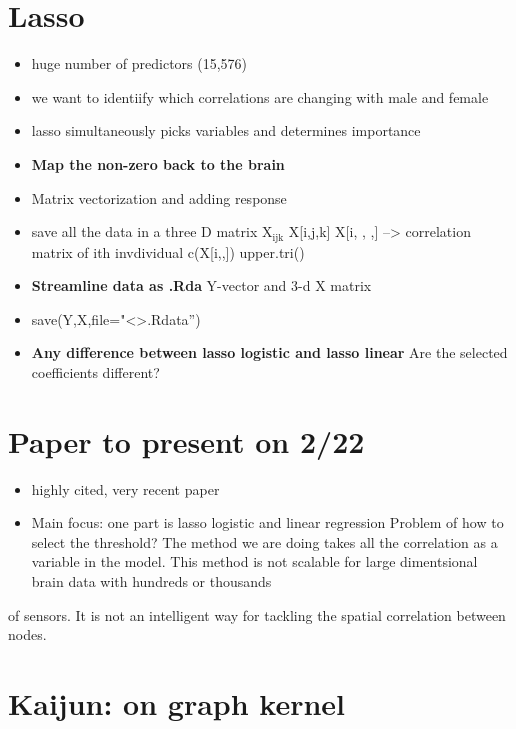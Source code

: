 \documentclass[11pt]{article}
\begin{document}
\section{Lasso}
\label{sec-2}
\begin{itemize}
\item huge number of predictors (15,576)
\item we want to identiify which correlations are changing with 
male and female
\item lasso simultaneously picks variables and determines importance

\item \textbf{Map the non-zero back to the brain}

\item Matrix vectorization and adding response
\item save all the data in a three D matrix X$_{\text{ijk}}$ X[i,j,k]
 X[i, , ,] --> correlation matrix of ith invdividual
c(X[i,,])
upper.tri()

\item \textbf{Streamline data as .Rda} Y-vector and 3-d X matrix

\item save(Y,X,file="<>.Rdata'')

\item \textbf{Any difference between lasso logistic and lasso linear}
  Are the selected coefficients different?
\end{itemize}

\section{Paper to present on 2/22}
\label{sec-3}

\begin{itemize}
\item highly cited, very recent paper

\item Main focus: one part is lasso logistic and linear regression
 Problem of how to select the threshold? The method we are doing
takes all the correlation as a variable in the model. This method is
not scalable for large dimentsional brain data with hundreds or thousands
\end{itemize}
of sensors. It is not an intelligent way for tackling the spatial correlation
between nodes.

\section{Kaijun: on graph kernel}
\label{sec-4}
\end{document}

